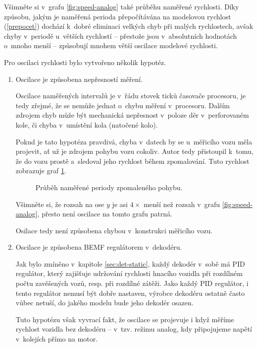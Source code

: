Všimněte si v~grafu \ref{fig:speed-analog} také průběhu naměřené rychlosti.
Díky způsobu, jakým je naměřená perioda přepočítávána na modelovou rychlost
(\ref{prepocet}) dochází k~dobré eliminaci velkých chyb při malých rychlostech,
avšak chyby v~periodě u~větších rychlostí -- přestože jsou v~absolutních
hodnotách o~mnoho menší -- způsobují mnohem větší oscilace modelové rychlosti.

Pro oscilaci rychlosti bylo vytvořeno několik hypotéz.

\begin{enumerate}
\item Oscilace je způsobena nepřesností měření.

Oscilace naměřených intervalů je v~řádu stovek ticků časovače procesoru, je tedy
zřejmé, že se nemůže jednat o~chybu měření v~procesoru. Dalším zdrojem chyb
může být mechanická nepřesnost v~poloze děr v~perforovaném kole, či chyba
v~umístění kola (natočené kolo).

Pokud je tato hypotéza pravdivá, chyba v~datech by se u~měřicího vozu měla
projevit, ať už je zdrojem pohybu vozu cokoliv. Autor tedy přistoupil k~tomu,
že do vozu prostě  a~sledoval jeho rychlost během zpomalování.
Tuto rychlost zobrazuje graf \ref{fig:speed-zduch}.

\begin{figure}[ht]

\caption{Průběh naměřené periody zpomaleného pohybu.}
\label{fig:speed-zduch}
\end{figure}

Všimněte si, že rozsah na ose $y$ je asi $4 \times$ menší než rozsah v~grafu
\ref{fig:speed-analog}, přesto není oscilace na tomto grafu patrná.

Osilace tedy není způsobena chybou v~konstrukci měřicího vozu.

\item Oscilace je způsobena \gls{BEMF} regulátorem v~dekodéru.

Jak bylo zmíněno v~kapitole \ref{sec:det-static}, každý dekodér v~sobě má PID
regulátor, který zajišťuje udržování rychlosti hnacího vozidla při rozdílném
počtu zavěšených vozů, resp. při rozdílné zátěži. Jako každý PID regulátor,
i tento regulátor nemusí být dobře nastaven, výrobce dekodéru ostatně často
vůbec netuší, do jakého modelu bude jeho dekodér osazen.

Tuto hypotézu však vyvrací fakt, že oscilace se projevuje i když měříme rychlost
vozidla bez dekodéru -- v~tzv. režimu analog, kdy připojujeme napětí v~kolejích
přímo na motor.


\end{enumerate}
